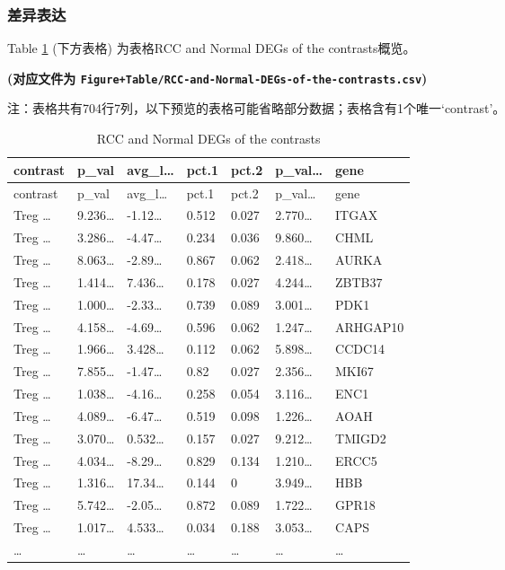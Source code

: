 \documentclass[
]{article}
\begin{document}
\hypertarget{ux5deeux5f02ux8868ux8fbe}{%
\subsubsection{差异表达}\label{ux5deeux5f02ux8868ux8fbe}}

Table \ref{tab:RCC-and-Normal-DEGs-of-the-contrasts} (下方表格) 为表格RCC and Normal DEGs of the contrasts概览。

\textbf{(对应文件为 \texttt{Figure+Table/RCC-and-Normal-DEGs-of-the-contrasts.csv})}

\begin{center}\begin{tcolorbox}[colback=gray!10, colframe=gray!50, width=0.9\linewidth, arc=1mm, boxrule=0.5pt]注：表格共有704行7列，以下预览的表格可能省略部分数据；表格含有1个唯一`contrast'。
\end{tcolorbox}
\end{center}

\begin{longtable}[]{@{}lllllll@{}}
\caption{\label{tab:RCC-and-Normal-DEGs-of-the-contrasts}RCC and Normal DEGs of the contrasts}\tabularnewline
\toprule
contrast & p\_val & avg\_l\ldots{} & pct.1 & pct.2 & p\_val\ldots{} & gene\tabularnewline
\midrule
\endfirsthead
\toprule
contrast & p\_val & avg\_l\ldots{} & pct.1 & pct.2 & p\_val\ldots{} & gene\tabularnewline
\midrule
\endhead
Treg \ldots{} & 9.236\ldots{} & -1.12\ldots{} & 0.512 & 0.027 & 2.770\ldots{} & ITGAX\tabularnewline
Treg \ldots{} & 3.286\ldots{} & -4.47\ldots{} & 0.234 & 0.036 & 9.860\ldots{} & CHML\tabularnewline
Treg \ldots{} & 8.063\ldots{} & -2.89\ldots{} & 0.867 & 0.062 & 2.418\ldots{} & AURKA\tabularnewline
Treg \ldots{} & 1.414\ldots{} & 7.436\ldots{} & 0.178 & 0.027 & 4.244\ldots{} & ZBTB37\tabularnewline
Treg \ldots{} & 1.000\ldots{} & -2.33\ldots{} & 0.739 & 0.089 & 3.001\ldots{} & PDK1\tabularnewline
Treg \ldots{} & 4.158\ldots{} & -4.69\ldots{} & 0.596 & 0.062 & 1.247\ldots{} & ARHGAP10\tabularnewline
Treg \ldots{} & 1.966\ldots{} & 3.428\ldots{} & 0.112 & 0.062 & 5.898\ldots{} & CCDC14\tabularnewline
Treg \ldots{} & 7.855\ldots{} & -1.47\ldots{} & 0.82 & 0.027 & 2.356\ldots{} & MKI67\tabularnewline
Treg \ldots{} & 1.038\ldots{} & -4.16\ldots{} & 0.258 & 0.054 & 3.116\ldots{} & ENC1\tabularnewline
Treg \ldots{} & 4.089\ldots{} & -6.47\ldots{} & 0.519 & 0.098 & 1.226\ldots{} & AOAH\tabularnewline
Treg \ldots{} & 3.070\ldots{} & 0.532\ldots{} & 0.157 & 0.027 & 9.212\ldots{} & TMIGD2\tabularnewline
Treg \ldots{} & 4.034\ldots{} & -8.29\ldots{} & 0.829 & 0.134 & 1.210\ldots{} & ERCC5\tabularnewline
Treg \ldots{} & 1.316\ldots{} & 17.34\ldots{} & 0.144 & 0 & 3.949\ldots{} & HBB\tabularnewline
Treg \ldots{} & 5.742\ldots{} & -2.05\ldots{} & 0.872 & 0.089 & 1.722\ldots{} & GPR18\tabularnewline
Treg \ldots{} & 1.017\ldots{} & 4.533\ldots{} & 0.034 & 0.188 & 3.053\ldots{} & CAPS\tabularnewline
\ldots{} & \ldots{} & \ldots{} & \ldots{} & \ldots{} & \ldots{} & \ldots{}\tabularnewline
\bottomrule
\end{longtable}
\end{document}
